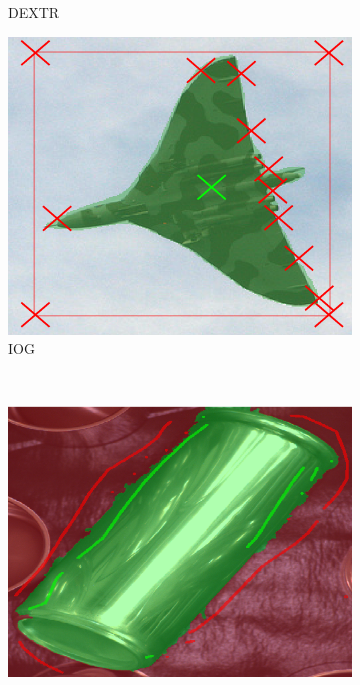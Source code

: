 \begin{figure}
\begin{subfigure}[t]{0.3\textwidth}
		\caption{
			DEXTR
		}
	\end{subfigure}
	\hfill
	\begin{subfigure}[t]{0.3\textwidth}
		\centering
		\includegraphics[width=\textwidth]{figures/appendix/method_predictions/jet4_iog.png}
		\caption{
			IOG
		}
	\end{subfigure}
	\\	
	\begin{subfigure}[t]{0.3\textwidth}
		\centering
		\includegraphics[width=\textwidth]{figures/appendix/method_predictions/cans75_watershed.png}

\end{subfigure}
\end{figure}
